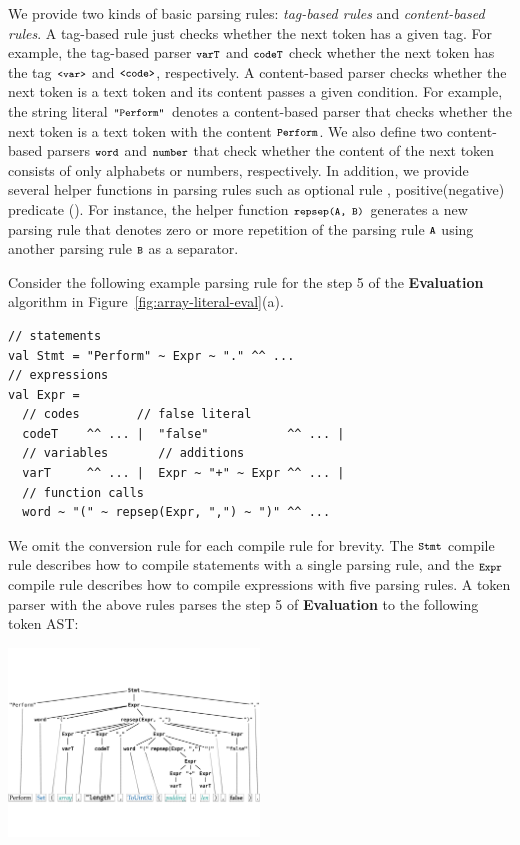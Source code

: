 We provide two kinds of basic parsing rules: \textit{tag-based rules} and
\textit{content-based rules}.  A tag-based rule just checks whether the next
token has a given tag.  For example, the tag-based parser \( \texttt{\footnotesize varT} \) and
\( \texttt{\footnotesize codeT} \) check whether the next token has the tag \( \texttt{\footnotesize<var>} \)
and \( \texttt{\footnotesize<code>} \), respectively.  A content-based parser checks whether
the next token is a text token and its content passes a given condition.  For
example, the string literal \( \texttt{\footnotesize"Perform"} \) denotes a content-based
parser that checks whether the next token is a text token with the content \(
\texttt{\footnotesize Perform} \).  We also define two content-based parsers \( \texttt{\footnotesize word} \)
and \( \texttt{\footnotesize number} \) that check whether the content of the next token
consists of only alphabets or numbers, respectively.  In addition, we provide
several helper functions in parsing rules such as optional rule ,
positive(negative) predicate ().  For instance, the helper
function \( \texttt{\footnotesize repsep(A, B)} \) generates a new parsing rule that denotes
zero or more repetition of the parsing rule \( \texttt{\footnotesize A} \) using another parsing
rule \( \texttt{\footnotesize B} \) as a separator.

Consider the following example parsing rule for the step 5 of the
\textbf{Evaluation} algorithm in Figure~\ref{fig:array-literal-eval}(a).
\begin{lstlisting}[style=myScalastyle]
// statements
val Stmt = "Perform" ~ Expr ~ "." ^^ ...
// expressions
val Expr =
  // codes        // false literal
  codeT    ^^ ... |  "false"           ^^ ... |
  // variables       // additions
  varT     ^^ ... |  Expr ~ "+" ~ Expr ^^ ... |
  // function calls
  word ~ "(" ~ repsep(Expr, ",") ~ ")" ^^ ...
\end{lstlisting}
We omit the conversion rule for each compile rule for brevity.  The \(
\texttt{\footnotesize Stmt} \) compile rule  describes how to compile statements with a single
parsing rule, and the \( \texttt{\footnotesize Expr} \) compile rule describes how to compile
expressions with five parsing rules.  A token parser with the above rules parses
the step 5 of \textbf{Evaluation} to the following token AST:
\begin{center}
  \includegraphics[width=0.5\textwidth]{img/token-ast.pdf}
\end{center}


